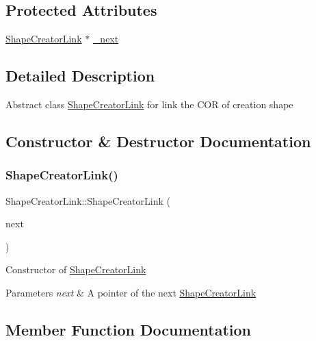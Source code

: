 \subsection*{Protected Attributes}
\begin{DoxyCompactItemize}
\item 
\hyperlink{class_shape_creator_link}{Shape\+Creator\+Link} $\ast$ \hyperlink{class_shape_creator_link_a53714771bfbce43504eac24c4acf7e6f}{\+\_\+next}
\end{DoxyCompactItemize}


\subsection{Detailed Description}
Abstract class \hyperlink{class_shape_creator_link}{Shape\+Creator\+Link} for link the C\+OR of creation shape 

\subsection{Constructor \& Destructor Documentation}
\hypertarget{class_shape_creator_link_a625ba24fc48628d42ddd206e65489de0}{}\label{class_shape_creator_link_a625ba24fc48628d42ddd206e65489de0} 
\subsubsection{\texorpdfstring{Shape\+Creator\+Link()}{ShapeCreatorLink()}}
{\footnotesize\ttfamily Shape\+Creator\+Link\+::\+Shape\+Creator\+Link (\begin{DoxyParamCaption}\item[{\hyperlink{class_shape_creator_link}{Shape\+Creator\+Link} $\ast$}]{next }\end{DoxyParamCaption})}

Constructor of \hyperlink{class_shape_creator_link}{Shape\+Creator\+Link} 
\begin{DoxyParams}{Parameters}
{\em next} & A pointer of the next \hyperlink{class_shape_creator_link}{Shape\+Creator\+Link} \\
\hline
\end{DoxyParams}


\subsection{Member Function Documentation}
\hypertarget{class_shape_creator_link_af372255e987c8fa587620e16dd406ccc}{}\label{class_shape_creator_link_af372255e987c8fa587620e16dd406ccc} 
